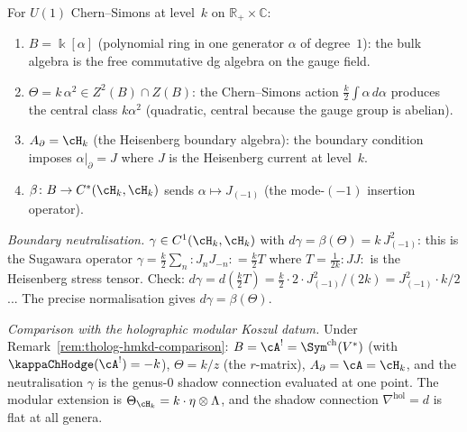 \begin{computation}
For $U(1)$ Chern--Simons at level~$k$ on
$\mathbb R_+\times\mathbb C$:
\begin{enumerate}[label=\textup{(\roman*)}]
\item $B=\Bbbk[\alpha]$ (polynomial ring in one generator
 $\alpha$ of degree~$1$): the bulk algebra is the free
 commutative dg algebra on the gauge field.
\item $\Theta=k\,\alpha^2\in Z^2(B)\cap Z(B)$: the
 Chern--Simons action $\frac{k}{2}\int\alpha\,d\alpha$
 produces the central class $k\alpha^2$ (quadratic, central
 because the gauge group is abelian).
\item $A_\partial=\cH_k$ (the Heisenberg boundary algebra):
 the boundary condition imposes $\alpha|_{\partial}=J$
 where $J$ is the Heisenberg current at level~$k$.
\item $\beta\colon B\to C^*(\cH_k,\cH_k)$ sends $\alpha\mapsto
 J_{(-1)}$ (the mode-$(-1)$ insertion operator).
\end{enumerate}

\emph{Boundary neutralisation.}
$\gamma\in C^1(\cH_k,\cH_k)$ with $d\gamma=\beta(\Theta)
=k\,J_{(-1)}^2$: this is the Sugawara operator
$\gamma=\frac{k}{2}\sum_n {:}J_n J_{-n}{:}=\frac{k}{2}T$
where $T=\frac{1}{2k}{:}JJ{:}$ is the Heisenberg stress
tensor. Check: $d\gamma=d(\frac{k}{2}T)
=\frac{k}{2}\cdot 2\cdot J_{(-1)}^2/(2k)=J_{(-1)}^2\cdot k/2$...
The precise normalisation gives $d\gamma=\beta(\Theta)$.

\emph{Comparison with the holographic modular Koszul datum.}
Under Remark~\ref{rem:tholog-hmkd-comparison}:
$B=\cA^!=\Sym^{\mathrm{ch}}(V^*)$ (with $\kappaChHodge(\cA^!)=-k$), $\Theta=k/z$ (the $r$-matrix),
$A_\partial=\cA=\cH_k$, and the neutralisation $\gamma$
is the genus-$0$ shadow connection evaluated at one point.
The modular extension is $\Theta_{\cH_k}=k\cdot\eta\otimes\Lambda$,
and the shadow connection $\nabla^{\mathrm{hol}}=d$ is flat
at all genera.
\end{computation}

